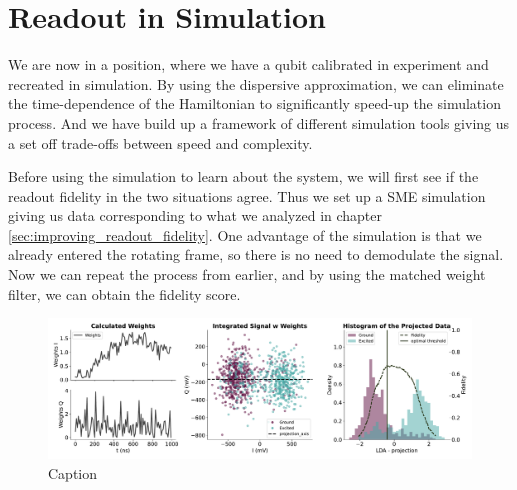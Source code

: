 \section{Readout in Simulation}
We are now in a position, where we have a qubit calibrated in experiment and recreated in simulation. By using the dispersive approximation, we can eliminate the time-dependence of the Hamiltonian to significantly speed-up the simulation process. And we have build up a framework of different simulation tools giving us a set off trade-offs between speed and complexity. 

Before using the simulation to learn about the system, we will first see if the readout fidelity in the two situations agree. Thus we set up a SME simulation giving us data corresponding to what we analyzed in chapter \ref{sec:improving_readout_fidelity}. One advantage of the simulation is that we already entered the rotating frame, so there is no need to demodulate the signal. Now we can repeat the process from earlier, and by using the matched weight filter, we can obtain the fidelity score.

\begin{figure}
    \centering
    \includegraphics[]{Simulations/readout_simulations/figures/weigted_simulation.pdf}
    \caption{Caption}
    \label{fig:enter-label}
\end{figure}

